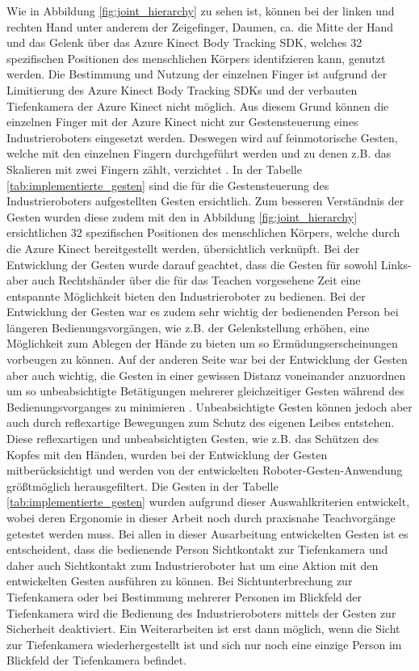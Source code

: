 Wie in Abbildung \ref{fig:joint_hierarchy} zu sehen ist, können bei der linken und rechten Hand unter anderem der Zeigefinger, Daumen, ca. die Mitte der Hand und das Gelenk über das Azure Kinect Body Tracking SDK, welches 32 spezifischen Positionen des menschlichen Körpers identifzieren kann, genutzt werden. Die Bestimmung und Nutzung der einzelnen Finger ist aufgrund der Limitierung des Azure Kinect Body Tracking SDKs und der verbauten Tiefenkamera der Azure Kinect nicht möglich. Aus diesem Grund können die einzelnen Finger mit der Azure Kinect nicht zur Gestensteuerung eines Industrieroboters eingesetzt werden. Deswegen wird auf feinmotorische Gesten, welche mit den einzelnen Fingern durchgeführt werden und zu denen z.B. das Skalieren mit zwei Fingern zählt, verzichtet \cite{qm13_azure_joints_nodate}. In der Tabelle \ref{tab:implementierte_gesten} sind die für die Gestensteuerung des Industrieroboters aufgestellten Gesten ersichtlich. Zum besseren Verständnis der Gesten wurden diese zudem mit den in Abbildung \ref{fig:joint_hierarchy} ersichtlichen 32 spezifischen Positionen des menschlichen Körpers, welche durch die Azure Kinect bereitgestellt werden, übersichtlich verknüpft. Bei der Entwicklung der Gesten wurde darauf geachtet, dass die Gesten für sowohl Links- aber auch Rechtshänder über die für das Teachen vorgesehene Zeit eine entspannte Möglichkeit bieten den Industrieroboter zu bedienen. Bei der Entwicklung der Gesten war es zudem sehr wichtig der bedienenden Person bei längeren Bedienungsvorgängen, wie z.B. der Gelenkstellung erhöhen, eine Möglichkeit zum Ablegen der Hände zu bieten um so Ermüdungserscheinungen vorbeugen zu können. Auf der anderen Seite war bei der Entwicklung der Gesten aber auch wichtig, die Gesten in einer gewissen Distanz voneinander anzuordnen um so unbeabsichtigte Betätigungen mehrerer gleichzeitiger Gesten während des Bedienungsvorganges zu minimieren \cite{proff_radikale_2013}. Unbeabsichtigte Gesten können jedoch aber auch durch reflexartige Bewegungen zum Schutz des eigenen Leibes entstehen. Diese reflexartigen und unbeabsichtigten Gesten, wie z.B. das Schützen des Kopfes mit den Händen, \cite[95]{matschnig_korpersprache_2007} wurden bei der Entwicklung der Gesten mitberücksichtigt und werden von der entwickelten Roboter-Gesten-Anwendung größtmöglich herausgefiltert. Die Gesten in der Tabelle \ref{tab:implementierte_gesten} wurden aufgrund dieser Auswahlkriterien entwickelt, wobei deren Ergonomie in dieser Arbeit noch durch praxisnahe Teachvorgänge getestet werden muss. Bei allen in dieser Ausarbeitung entwickelten Gesten ist es entscheident, dass die bedienende Person Sichtkontakt zur Tiefenkamera und daher auch Sichtkontakt zum Industrieroboter hat um eine Aktion mit den entwickelten Gesten ausführen zu können. Bei Sichtunterbrechung zur Tiefenkamera oder bei Bestimmung mehrerer Personen im Blickfeld der Tiefenkamera wird die Bedienung des Industrieroboters mittels der Gesten zur Sicherheit deaktiviert. Ein Weiterarbeiten ist erst dann möglich, wenn die Sicht zur Tiefenkamera wiederhergestellt ist und sich nur noch eine einzige Person im Blickfeld der Tiefenkamera befindet.\newline

